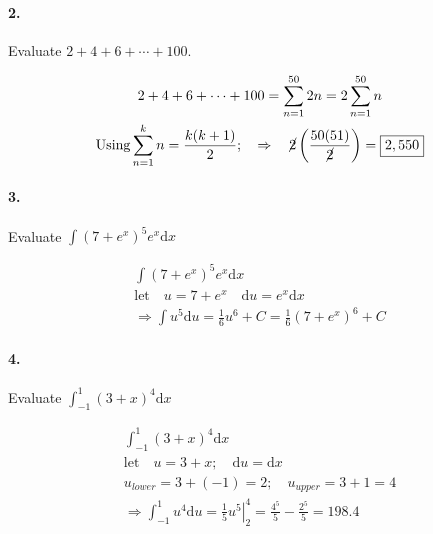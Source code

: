     \paragraph*{2.}
    Evaluate $2+4+6+\cdots+100$.

    \begin{mdframed}
        \begin{equation*}
            \begin{gathered}
                2+4+6+\cdots+100 = \sum_{n=1}^{50}2n = 2\sum_{n=1}^{50}n    \\
                \text{Using} \sum_{n=1}^{k}n = \frac{k(k+1)}{2}; \quad \Rightarrow \quad \cancel{2}\left(\frac{50(51)}{\cancel{2}}\right) = \boxed{2,550}
            \end{gathered}
        \end{equation*}
    \end{mdframed}

    \paragraph*{3.}
    Evaluate $\displaystyle\int(7+e^x)^5 e^x \mathrm{d}x$

    \begin{mdframed}
        \begin{equation*}
            \begin{gathered}
                \int(7+e^x)^5 e^x \mathrm{d}x                                   \\
                \text{let} \quad u = 7 + e^x \quad \mathrm{d}u = e^x\mathrm{d}x \\
                \Rightarrow\int u^5\mathrm{d}u = \frac{1}{6}u^6 + C = \boxed{\frac{1}{6}(7 + e^x)^6 + C}
            \end{gathered}
        \end{equation*}
    \end{mdframed}

    \paragraph*{4.}
    Evaluate $\displaystyle\int_{-1}^{1}(3+x)^4 \mathrm{d}x$

    \begin{mdframed}
        \begin{equation*}
            \begin{gathered}
                \int_{-1}^{1}(3+x)^4 \mathrm{d}x                                \\
                \text{let} \quad u = 3 + x; \quad \mathrm{d}u = \mathrm{d}x     \\
                u_{lower} = 3 + (-1) = 2; \quad u_{upper} = 3 + 1 = 4                  \\
                \Rightarrow\int_{-1}^{1}u^4 \mathrm{d}u = \left.\frac{1}{5}u^5 \right|_{2}^{4}= \frac{4^5}{5} - \frac{2^5}{5} = \boxed{198.4}
            \end{gathered}
        \end{equation*}
    \end{mdframed}
